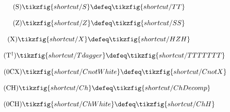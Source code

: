 \begin{figure}[ht]
{{\begin{minipage}{0.975\textwidth}
\begin{minipage}{0.25\textwidth}
        \centering
        \begin{equation}
            \tag{S}\label{t-oldS}
            \tikzfig{shortcut/S} \defeq \tikzfig{shortcut/TT}
        \end{equation}
    \end{minipage}
    \begin{minipage}{0.25\textwidth}
        \centering
        \begin{equation}
            \tag{Z}\label{t-oldZ}
            \tikzfig{shortcut/Z} \defeq \tikzfig{shortcut/SS}
        \end{equation}
    \end{minipage}
    \begin{minipage}{0.35\textwidth}
        \centering
        \begin{equation}
            \tag{X}\label{t-oldX}
            \tikzfig{shortcut/X} \defeq \tikzfig{shortcut/HZH}
        \end{equation}
    \end{minipage}\vspace{-0.6em}
    \begin{minipage}{0.25\textwidth}
        \centering
        \begin{equation}
            \tag{T$^\dagger$}\label{t-oldTdagger}
            \tikzfig{shortcut/Tdagger} \defeq \tikzfig{shortcut/TTTTTTT}
        \end{equation}
    \end{minipage}
    \begin{minipage}{0.35\textwidth}
        \centering
        \begin{equation}
            \tag{0CX}\label{t-oldCnotWhite}
            \tikzfig{shortcut/CnotWhite} \defeq \tikzfig{shortcut/CnotX}
        \end{equation}
    \end{minipage}\vspace{-0.6em}
    \begin{minipage}{0.54\textwidth}
        \centering
        \begin{equation}
            \tag{CH}\label{t-oldCh}
            \tikzfig{shortcut/Ch} \defeq \tikzfig{shortcut/ChDecomp}
        \end{equation}
    \end{minipage}
    \begin{minipage}{0.36\textwidth}
        \centering
        \begin{equation}
            \tag{0CH}\label{t-oldChWhite}
            \tikzfig{shortcut/ChWhite} \defeq \tikzfig{shortcut/ChH}

\end{equation}
\end{minipage}
\end{minipage}}}
\end{figure}
